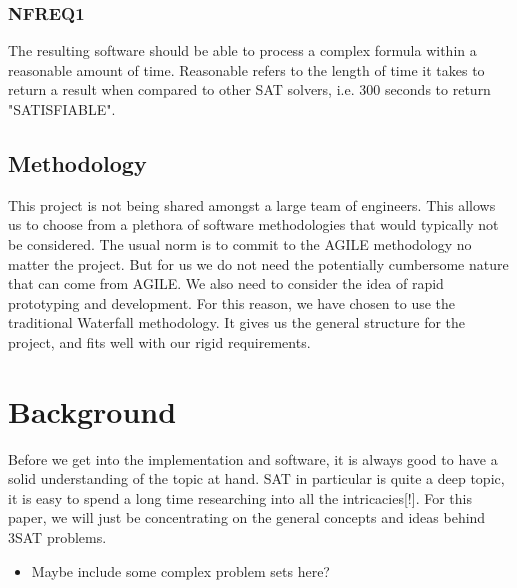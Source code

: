 \documentclass{article}
\begin{document}
\subsubsection{NFREQ1}
The resulting software should be able to process a complex formula within a reasonable amount of time. Reasonable refers to the length of time it takes to return a result when compared to other SAT solvers, i.e. 300 seconds to return "SATISFIABLE".


\subsection{Methodology}
This project is not being shared amongst a large team of engineers. This allows us to choose from a plethora of software methodologies that would typically not be considered. The usual norm is to commit to the AGILE methodology no matter the project. But for us we do not need the potentially cumbersome nature that can come from AGILE. We also need to consider the idea of rapid prototyping and development. For this reason, we have chosen to use the traditional Waterfall methodology. It gives us the general structure for the project, and fits well with our rigid requirements.

\section{Background}
Before we get into the implementation and software, it is always good to have a solid understanding
of the topic at hand. SAT in particular is quite a deep topic, it is easy to spend a long time
researching into all the intricacies[!]. For this paper, we will just be concentrating on the
general concepts and ideas behind 3SAT problems.

\begin{itemize}
    \item Maybe include some complex problem sets here?
\end{itemize}
\end{document}
